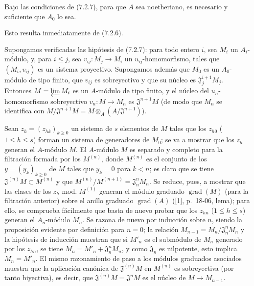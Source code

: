 \begin{corollary}[7.2.8]
\label{0.7.2.8-fr}
Bajo las condiciones de \textup{(7.2.7)}, para que $A$ sea noetheriano, es necesario y
suficiente que $A_0$ lo sea.
\end{corollary}

Esto resulta inmediatamente de (7.2.6).

\begin{proposition}[7.2.9]
\label{0.7.2.9-fr}
Supongamos verificadas las hipótesis de \textup{(7.2.7)}: para todo entero $i$, sea
$M_i$ un $A_i$-módulo, y, para $i\leq j$, sea
$v_{ij}:M_j\to M_i$ un $u_{ij}$-homomorfismo, tales que $(M_i,v_{ij})$ es un
sistema proyectivo. Supongamos además que $M_0$ es un $A_0$-módulo de tipo
finito, que $v_{ij}$ es sobreyectivo y que su núcleo es
$\mathfrak J_j^{i+1}M_j$. Entonces $M=\varprojlim M_i$ es un $A$-módulo de tipo
finito, y el núcleo del $u_n$-homomorfismo sobreyectivo $v_n:M\to M_n$ es
$\mathfrak J^{n+1}M$ \textup{(de modo que $M_n$ se identifica con
$M/\mathfrak J^{n+1}M=M\otimes_A(A/\mathfrak J^{n+1})$)}.
\end{proposition}

Sean $z_h=(z_{hk})_{k\geq0}$ un sistema de $s$ elementos de $M$ tales que los
$z_{h0}$ ($1\leq h\leq s$) forman un sistema de generadores de $M_0$; se va a
mostrar que los $z_h$ generan el $A$-módulo $M$. El $A$-módulo $M$ es
separado y completo para la filtración formada por los $M^{(n)}$, donde $M^{(n)}$
es el conjunto de los $y=(y_k)_{k\geq0}$ de $M$ tales que $y_k=0$ para $k<n$;
es claro que se tiene $\mathfrak J^{(n)}M\subset M^{(n)}$ y que
$M^{(n)}/M^{(n+1)}=\mathfrak J_n^nM_n$. Se reduce, pues, a mostrar que las
clases de los $z_h$ mod. $M^{(1)}$ generan el módulo graduado
$\operatorname{grad}(M)$ (para la filtración anterior) sobre el anillo graduado
$\operatorname{grad}(A)$ ([1], p.~18-06, lema); para ello, se comprueba
fácilmente que basta de nuevo probar que los $z_{hn}$ ($1\leq h\leq s$)
generan el $A_n$-módulo $M_n$. Se razona de nuevo por inducción sobre
$n$, siendo la proposición evidente por definición para $n=0$; la relación
$M_{n-1}=M_n/\mathfrak J_n^nM_n$ y la hipótesis de inducción muestran que si
$M'_n$ es el submódulo de $M_n$ generado por los $z_{hn}$, se tiene
$M_n=M'_n+\mathfrak J_n^nM_n$, y como $\mathfrak J_n$ es nilpotente, esto
implica $M_n=M'_n$. El mismo razonamiento de paso a los módulos graduados
asociados muestra que la aplicación canónica de $\mathfrak J^{(n)}M$ en
$M^{(n)}$ es sobreyectiva (por tanto biyectiva), es decir, que
$\mathfrak J^{(n)}M=\mathfrak J^nM$ es el núcleo de $M\to M_{n-1}$.

